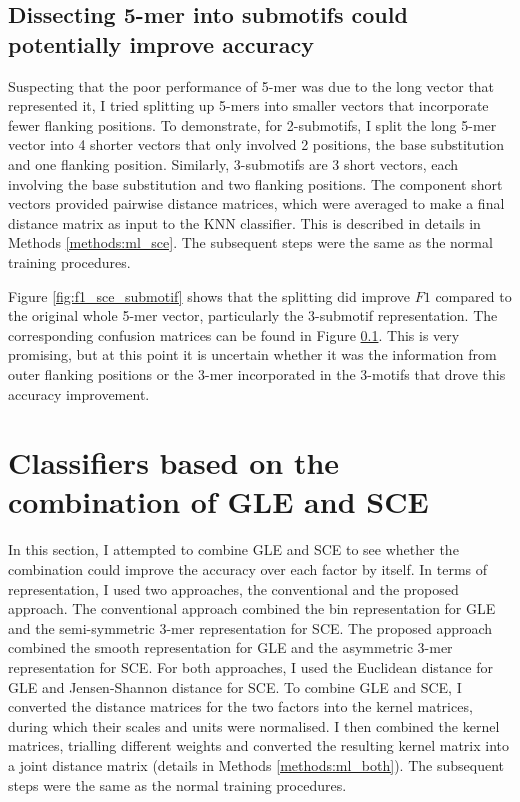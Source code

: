 

\subsection{Dissecting 5-mer into submotifs could potentially improve accuracy}
Suspecting that the poor performance of 5-mer was due to the long vector that represented it, I tried splitting up 5-mers into smaller vectors that incorporate fewer flanking positions. To demonstrate, for 2-submotifs, I split the long 5-mer vector into 4 shorter vectors that only involved 2 positions, the base substitution and one flanking position. Similarly, 3-submotifs are 3 short vectors, each involving the base substitution and two flanking positions. The component short vectors provided pairwise distance matrices, which were averaged to make a final distance matrix as input to the KNN classifier. This is described in details in Methods \ref{methods:ml_sce}. The subsequent steps were the same as the normal training procedures.

Figure \ref{fig:f1_sce_submotif} shows that the splitting did improve $F1$ compared to the original whole 5-mer vector, particularly the 3-submotif representation. The corresponding confusion matrices can be found in Figure \ref{}. This is very promising, but at this point it is uncertain whether it was the information from outer flanking positions or the 3-mer incorporated in the 3-motifs that drove this accuracy improvement.



\section{Classifiers based on the combination of GLE and SCE}\label{ml:both}
In this section, I attempted to combine GLE and SCE to see whether the combination could improve the accuracy over each factor by itself. In terms of representation, I used two approaches, the conventional and the proposed approach. The conventional approach combined the bin representation for GLE and the semi-symmetric 3-mer representation for SCE. The proposed approach combined the smooth representation for GLE and the asymmetric 3-mer representation for SCE. For both approaches, I used the Euclidean distance for GLE and Jensen-Shannon distance for SCE. To combine GLE and SCE, I converted the distance matrices for the two factors into the kernel matrices, during which their scales and units were normalised. I then combined the kernel matrices, trialling different weights and converted the resulting kernel matrix into a joint distance matrix (details in Methods \ref{methods:ml_both}). The subsequent steps were the same as the normal training procedures.

